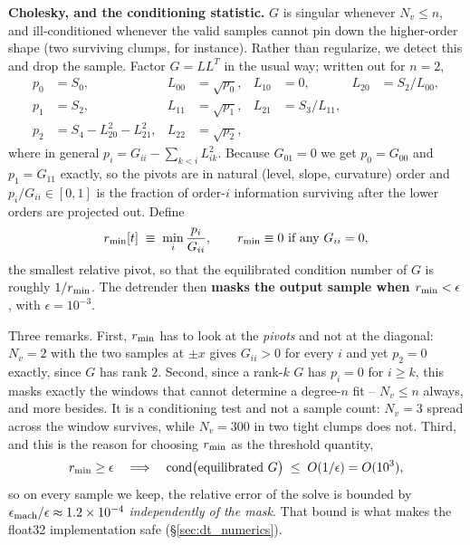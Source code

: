 \documentclass{article}
\numberwithin{equation}{section}   %
\def\nn{\nonumber}
\begin{document}
{\bf Cholesky, and the conditioning statistic.}
$G$ is singular whenever $N_v \le n$, and ill-conditioned whenever the valid samples cannot pin down the
higher-order shape (two surviving clumps, for instance).  Rather than regularize, we detect this and drop the
sample.  Factor $G = LL^T$ in the usual way; written out for $n=2$,
\begin{align}
p_0 &= S_0,                              & L_{00} &= \sqrt{p_0}, & L_{10} &= 0, & L_{20} &= S_2/L_{00}, \nn \\
p_1 &= S_2,                              & L_{11} &= \sqrt{p_1}, & L_{21} &= S_3/L_{11}, \nn \\
p_2 &= S_4 - L_{20}^2 - L_{21}^2,        & L_{22} &= \sqrt{p_2},
\label{eq:dt_chol}
\end{align}
where in general $p_i = G_{ii} - \sum_{k<i} L_{ik}^2$.  Because $G_{01} = 0$ we get $p_0 = G_{00}$ and
$p_1 = G_{11}$ exactly, so the pivots are in natural (level, slope, curvature) order and $p_i/G_{ii} \in [0,1]$
is the fraction of order-$i$ information surviving after the lower orders are projected out.  Define
\begin{equation}
r_{\rm min}[t] \;\equiv\; \min_i \frac{p_i}{G_{ii}} , \qquad r_{\rm min} \equiv 0 \mbox{ if any } G_{ii} = 0,
\label{eq:dt_rmin}
\end{equation}
the smallest relative pivot, so that the equilibrated condition number of $G$ is roughly $1/r_{\rm min}$.  The
detrender then {\bf masks the output sample when $r_{\rm min} < \epsilon$}, with $\epsilon = 10^{-3}$.

Three remarks.  First, $r_{\rm min}$ has to look at the {\em pivots} and not at the diagonal: $N_v = 2$ with the
two samples at $\pm x$ gives $G_{ii} > 0$ for every $i$ and yet $p_2 = 0$ exactly, since $G$ has rank $2$.
Second, since a rank-$k$ $G$ has $p_i = 0$ for $i \ge k$, this masks exactly the windows that cannot determine a
degree-$n$ fit -- $N_v \le n$ always, and more besides.  It is a conditioning test and not a sample count:
$N_v = 3$ spread across the window survives, while $N_v = 300$ in two tight clumps does not.
Third, and this is the reason for choosing $r_{\rm min}$ as the threshold quantity,
\begin{equation}
r_{\rm min} \ge \epsilon
\quad\Longrightarrow\quad
{\rm cond}\big(\mbox{equilibrated } G\big) \;\le\; O(1/\epsilon) = O(10^3) ,
\label{eq:dt_cond_bound}
\end{equation}
so on every sample we keep, the relative error of the solve is bounded by
$\epsilon_{\rm mach}/\epsilon \approx 1.2\times10^{-4}$ {\em independently of the mask}.  That bound is what
makes the float32 implementation safe (\S\ref{sec:dt_numerics}).
\end{document}
